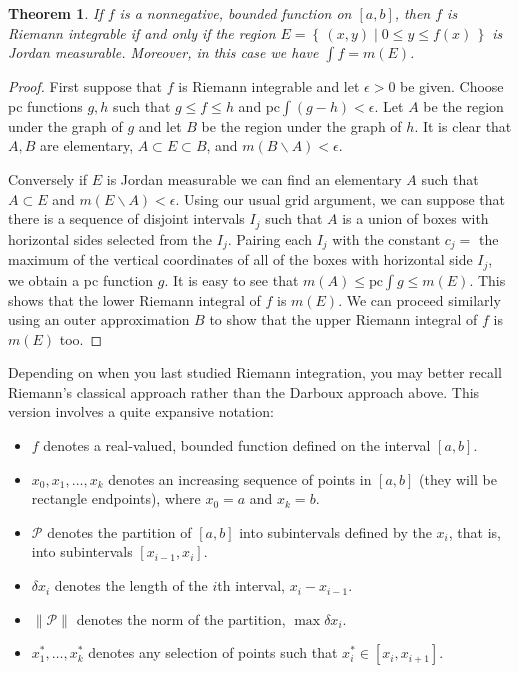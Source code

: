 \documentclass[11pt,oneside]{amsbook}
\newcommand{\set}[1]{\left\{\,#1\,\right\}}
\renewcommand{\setminus}{\smallsetminus}
\theoremstyle{definition}
\theoremstyle{plain}
\newtheorem{thm}{Theorem}[section]
\theoremstyle{definition}
\theoremstyle{remark}
\numberwithin{equation}{section}
\numberwithin{figure}{section}
\begin{document}
\begin{thm}
  If $f$ is a nonnegative, bounded function on $[a,b]$, then $f$ is Riemann integrable if and only if the region $E=\set{(x,y)\mid0\leq y\leq f(x)}$ is Jordan measurable. Moreover, in this case we have $\int f=m(E)$.
\end{thm}

\begin{proof}
  First suppose that $f$ is Riemann integrable and let $\epsilon>0$ be given. Choose pc functions $g,h$ such that $g\leq f\leq h$ and $\text{pc}\int(g-h)<\epsilon$. Let $A$ be the region under the graph of $g$ and let $B$ be the region under the graph of $h$. It is clear that $A,B$ are elementary, $A\subset E\subset B$, and $m(B\setminus A)<\epsilon$.

  Conversely if $E$ is Jordan measurable we can find an elementary $A$ such that $A\subset E$ and $m(E\setminus A)<\epsilon$. Using our usual grid argument, we can suppose that there is a sequence of disjoint intervals $I_j$ such that $A$ is a union of boxes with horizontal sides selected from the $I_j$. Pairing each $I_j$ with the constant $c_j=$ the maximum of the vertical coordinates of all of the boxes with horizontal side $I_j$, we obtain a pc function $g$. It is easy to see that $m(A)\leq \text{pc}\int g\leq m(E)$. This shows that the lower Riemann integral of $f$ is $m(E)$. We can proceed similarly using an outer approximation $B$ to show that the upper Riemann integral of $f$ is $m(E)$ too.
\end{proof}

Depending on when you last studied Riemann integration, you may better recall Riemann's classical approach rather than the Darboux approach above. This version involves a quite expansive notation:

\begin{itemize}
\item $f$ denotes a real-valued, bounded function defined on the interval $[a,b]$.
\item $x_0,x_1,\ldots,x_k$ denotes an increasing sequence of points in $[a,b]$ (they will be rectangle endpoints), where $x_0=a$ and $x_k=b$.
\item $\mathcal P$ denotes the partition of $[a,b]$ into subintervals defined by the $x_i$, that is, into subintervals $[x_{i-1},x_i]$.
\item $\delta x_i$ denotes the length of the $i$th interval, $x_i-x_{i-1}$.
\item $\|\mathcal P\|$ denotes the norm of the partition, $\max\delta x_i$.
\item $x_1^*,\ldots,x_k^*$ denotes any selection of points such that $x_i^*\in[x_i,x_{i+1}]$.
\end{itemize}
\end{document}
